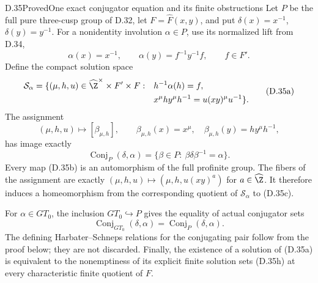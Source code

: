 \begin{claim}{D.35}{Proved}{One exact conjugator equation and its finite obstructions}
Let $P$ be the full pure three-cusp group of D.32, let
$F=\widehat F(x,y)$, and put
$\delta(x)=x^{-1}$, $\delta(y)=y^{-1}$.
For a nonidentity involution $\alpha\in P$, use its normalized
lift from D.34,
\[
 \alpha(x)=x^{-1},\qquad
 \alpha(y)=f^{-1}y^{-1}f,\qquad f\in F'.
\]
Define the compact solution space
\[
\begin{split}
 \mathcal S_\alpha=\{(\mu,h,u)\in
       \widehat\Z^\times\times F'\times F:\quad&
       h^{-1}\alpha(h)=f,\\
       &x^\mu h y^\mu h^{-1}
                    =u(xy)^\mu u^{-1}\}.
\end{split}                                                   \tag{D.35a}
\]
The assignment
\[
 (\mu,h,u)\longmapsto
 \left[\beta_{\mu,h}\right],\qquad
 \beta_{\mu,h}(x)=x^\mu,\quad
 \beta_{\mu,h}(y)=h y^\mu h^{-1},                              \tag{D.35b}
\]
has image exactly
\[
 \operatorname{Conj}_{P}(\delta,\alpha)
       =\{\beta\in P:\ \beta\delta\beta^{-1}=\alpha\}.
                                                                  \tag{D.35c}
\]
Every map (D.35b) is an automorphism of the full profinite
group.  The fibers of the assignment are exactly
$(\mu,h,u)\mapsto(\mu,h,u(xy)^a)$ for $a\in\widehat\Z$.
It therefore induces a homeomorphism from the corresponding
quotient of $\mathcal S_\alpha$ to (D.35c).

For $\alpha\in GT_0$, the inclusion $GT_0\hookrightarrow P$
gives the equality of actual conjugator sets
\[
       \operatorname{Conj}_{GT_0}(\delta,\alpha)
             =\operatorname{Conj}_{P}(\delta,\alpha).             \tag{D.35d}
\]
The defining Harbater--Schneps relations for the conjugating
pair follow from the proof below; they are not discarded.
Finally, the existence of a solution of (D.35a) is equivalent
to the nonemptiness of its explicit finite solution sets
(D.35h) at every characteristic finite quotient of $F$.
\end{claim}
